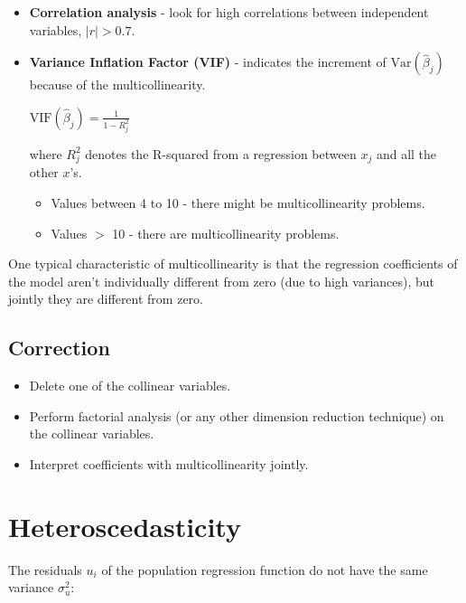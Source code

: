 \documentclass[10pt, a4paper, landscape]{article}
\newcommand{\Var}{\mathrm{Var}}
\begin{document}
\begin{multicols}{3}
		\begin{itemize}[leftmargin=*]
			\item \textbf{Correlation analysis} - look for high correlations between independent variables, $\lvert r \rvert > 0.7$.
			\item \textbf{Variance Inflation Factor (VIF)} - indicates the increment of $\Var(\hat{\beta}_{j})$ because of the multicollinearity.
			
			\begin{center}
				$\mathrm{VIF}(\hat{\beta}_{j}) = \frac{1}{1 - R_{j}^{2}}$
			\end{center}
			
			where $R^{2}_{j}$ denotes the R-squared from a regression between $x_{j}$ and all the other $x$'s.
			
			\begin{itemize}[leftmargin=*]
				\item Values between 4 to 10 - there might be multicollinearity problems.
				\item Values $>$ 10 - there are multicollinearity problems.
			\end{itemize}
		\end{itemize}
		
		One typical characteristic of multicollinearity is that the regression coefficients of the model aren't individually different from zero (due to high variances), but jointly they are different from zero.
		
		\subsection*{Correction}
		
		\begin{itemize}[leftmargin=*]
			\item Delete one of the collinear variables.
			\item Perform factorial analysis (or any other dimension reduction technique) on the collinear variables.
			\item Interpret coefficients with multicollinearity jointly.
		\end{itemize}
		
		\columnbreak
		
		\section*{Heteroscedasticity}
		
		The residuals $u_{i}$ of the population regression function do not have the same variance $\sigma^{2}_{u}$:
		

\end{multicols}
\end{document}
